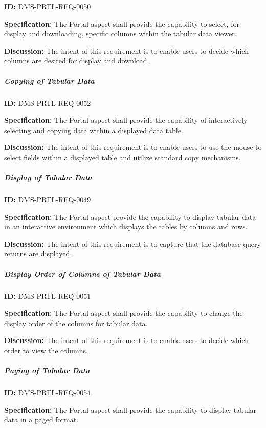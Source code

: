 \documentclass[SE,toc,lsstdraft]{lsstdoc}
\begin{document}
\label{DMS-PRTL-REQ-0050}
\textbf{ID:} DMS-PRTL-REQ-0050

\textbf{Specification:}
The Portal aspect shall provide the capability to select, for display and downloading, specific columns within the tabular data viewer.

\textbf{Discussion:}
The intent of this requirement is to enable users to decide which columns are desired for display and download.

\subparagraph{Copying of Tabular Data}\hfill  %

\label{DMS-PRTL-REQ-0052}
\textbf{ID:} DMS-PRTL-REQ-0052

\textbf{Specification:}
The Portal aspect shall provide the capability of interactively selecting and copying data within a displayed data table.

\textbf{Discussion:}
The intent of this requirement is to enable users to use the mouse to select fields within a displayed table and utilize standard copy mechanisms.

\subparagraph{Display of Tabular Data}\hfill  %

\label{DMS-PRTL-REQ-0049}
\textbf{ID:} DMS-PRTL-REQ-0049

\textbf{Specification:}
The Portal aspect provide the capability to display tabular data in an interactive environment which displays the tables by columns and rows.

\textbf{Discussion:}
The intent of this requirement is to capture that the database query returns are displayed.

\subparagraph{Display Order of Columns of Tabular Data}\hfill  %

\label{DMS-PRTL-REQ-0051}
\textbf{ID:} DMS-PRTL-REQ-0051

\textbf{Specification:}
The Portal aspect shall provide the capability to change the display order of the columns for tabular data.

\textbf{Discussion:}
The intent of this requirement is to enable users to decide which order to view the columns.

\subparagraph{Paging of Tabular Data}\hfill  %

\label{DMS-PRTL-REQ-0054}
\textbf{ID:} DMS-PRTL-REQ-0054

\textbf{Specification:}
The Portal aspect shall provide the capability to display tabular data in a paged format.
\end{document}
